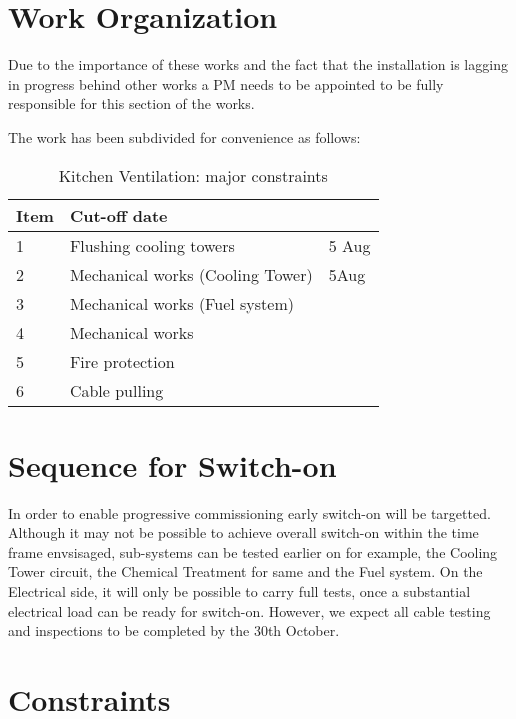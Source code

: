 \section{Work Organization}
Due to the importance of these works and the fact that the installation is lagging in progress behind other works a PM needs to be appointed to be fully responsible for this section of the works.

The work has been subdivided for convenience as follows:

\begin{table}[htbp] 
	    \begin{tabular}{l p{4cm}l}
	      \toprule
	     Item & Cut-off date  \\
	      \midrule
                  1 &Flushing cooling towers & 5 Aug\\
                  2 &Mechanical works (Cooling Tower) &5Aug \\
                  3 &Mechanical works (Fuel system)     &       \\
                  4 &Mechanical works                &       \\
                  5 & Fire protection                              &        \\
                  6 & Cable pulling                                 &       \\
	       \bottomrule
	    \end{tabular}
           \caption{Kitchen Ventilation:  major constraints}
            \end{table}


\section{Sequence for Switch-on}
\normalsize
In order to enable progressive commissioning early switch-on will be targetted. Although it may not be possible to achieve overall switch-on within the time frame envsisaged, sub-systems can be tested earlier on for example, the Cooling Tower circuit, the Chemical Treatment for same and the Fuel system. On the Electrical side, it will only be possible to carry full tests, once a substantial electrical load can be ready for switch-on. However, we expect all cable testing and inspections to be completed by the 30th October.

\section{Constraints}
